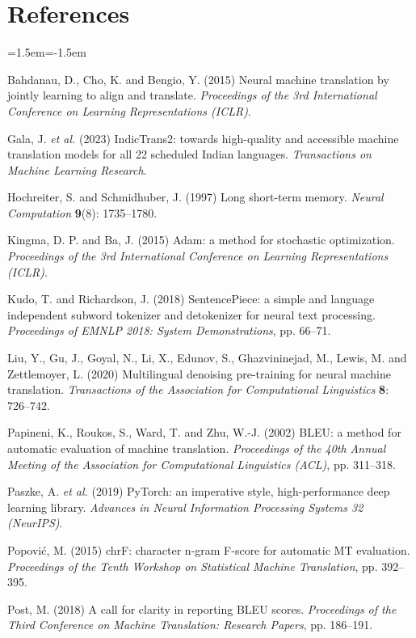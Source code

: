 \documentclass[11pt,a4paper]{article}
\begin{document}
\section*{References}
\begin{list}{}{\leftmargin=1.5em\itemindent=-1.5em\itemsep=2pt\parsep=0pt}
\small
\item Bahdanau, D., Cho, K. and Bengio, Y. (2015) Neural machine translation by jointly learning to align and translate. \textit{Proceedings of the 3rd International Conference on Learning Representations (ICLR)}.
\item Gala, J. \textit{et al.} (2023) IndicTrans2: towards high-quality and accessible machine translation models for all 22 scheduled Indian languages. \textit{Transactions on Machine Learning Research}.
\item Hochreiter, S. and Schmidhuber, J. (1997) Long short-term memory. \textit{Neural Computation} \textbf{9}(8): 1735--1780.
\item Kingma, D. P. and Ba, J. (2015) Adam: a method for stochastic optimization. \textit{Proceedings of the 3rd International Conference on Learning Representations (ICLR)}.
\item Kudo, T. and Richardson, J. (2018) SentencePiece: a simple and language independent subword tokenizer and detokenizer for neural text processing. \textit{Proceedings of EMNLP 2018: System Demonstrations}, pp. 66--71.
\item Liu, Y., Gu, J., Goyal, N., Li, X., Edunov, S., Ghazvininejad, M., Lewis, M. and Zettlemoyer, L. (2020) Multilingual denoising pre-training for neural machine translation. \textit{Transactions of the Association for Computational Linguistics} \textbf{8}: 726--742.
\item Papineni, K., Roukos, S., Ward, T. and Zhu, W.-J. (2002) BLEU: a method for automatic evaluation of machine translation. \textit{Proceedings of the 40th Annual Meeting of the Association for Computational Linguistics (ACL)}, pp. 311--318.
\item Paszke, A. \textit{et al.} (2019) PyTorch: an imperative style, high-performance deep learning library. \textit{Advances in Neural Information Processing Systems 32 (NeurIPS)}.
\item Popovi\'c, M. (2015) chrF: character n-gram F-score for automatic MT evaluation. \textit{Proceedings of the Tenth Workshop on Statistical Machine Translation}, pp. 392--395.
\item Post, M. (2018) A call for clarity in reporting BLEU scores. \textit{Proceedings of the Third Conference on Machine Translation: Research Papers}, pp. 186--191.

\end{list}
\end{document}
